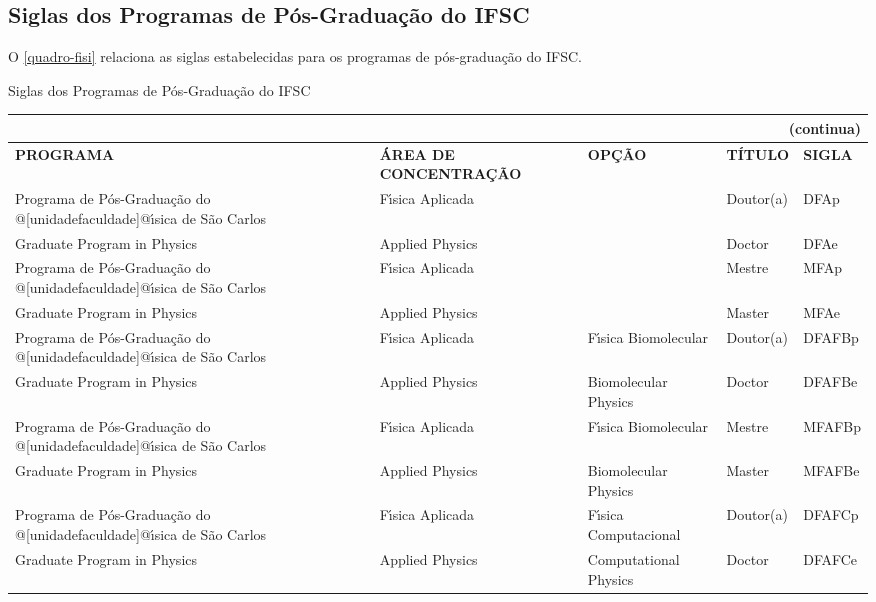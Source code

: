 \begin{apendicesenv}
\chapter{Siglas dos Programas de P\'os-Gradua\c{c}\~ao do IFSC}
O \autoref{quadro-fisi} relaciona as siglas estabelecidas para os programas de p\'os-gradua\c{c}\~ao do IFSC.
\begin{quadro}[Htb] 
	\ABNTEXfontereduzida
	\caption[Siglas dos Programas de P\'os-Gradua\c{c}\~ao do IFSC]{Siglas dos Programas de P\'os-Gradua\c{c}\~ao do IFSC}
	\label{quadro-fisi}
	\begin{tabular}{|p{3.5cm}|p{3.5cm}|p{3.5cm}|p{1.5cm}|p{2.25cm}|}
	\multicolumn{5}{r}{{(continua)}} \\ 
    \hline
		\textbf{PROGRAMA} & \textbf{\'AREA DE CONCENTRA\c{C}\~AO} & \textbf{OP\c{C}\~AO} & \textbf{T\'ITULO} & \textbf{SIGLA}  \\
		\hline
		Programa de P\'os-Gradua\c{c}\~ao do @[unidadefaculdade]@\'{\i}sica de S\~ao Carlos & F\'{\i}sica Aplicada &  & Doutor(a) & DFAp\\
		Graduate Program in Physics & Applied Physics &  & Doctor & DFAe\\
		Programa de P\'os-Gradua\c{c}\~ao do @[unidadefaculdade]@\'{\i}sica de S\~ao Carlos & F\'{\i}sica Aplicada &  & Mestre & MFAp\\
		Graduate Program in Physics & Applied Physics &  & Master & MFAe\\
		Programa de P\'os-Gradua\c{c}\~ao do @[unidadefaculdade]@\'{\i}sica de S\~ao Carlos & F\'{\i}sica Aplicada & F\'{\i}sica Biomolecular & Doutor(a) & DFAFBp\\
		Graduate Program in Physics & Applied Physics & Biomolecular Physics & Doctor & DFAFBe\\
		Programa de P\'os-Gradua\c{c}\~ao do @[unidadefaculdade]@\'{\i}sica de S\~ao Carlos & F\'{\i}sica Aplicada & F\'{\i}sica Biomolecular & Mestre & MFAFBp\\
		Graduate Program in Physics & Applied Physics & Biomolecular Physics & Master & MFAFBe\\
		Programa de P\'os-Gradua\c{c}\~ao do @[unidadefaculdade]@\'{\i}sica de S\~ao Carlos & F\'{\i}sica Aplicada & F\'{\i}sica Computacional & Doutor(a) & DFAFCp\\
		Graduate Program in Physics & Applied Physics & Computational Physics & Doctor & DFAFCe\\		

	\end{tabular}
\end{quadro}


\end{apendicesenv}
